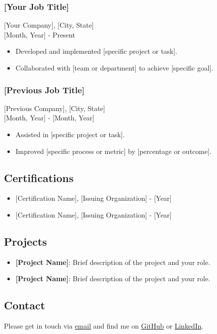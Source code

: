 \documentclass[11pt,a4paper]{article}
\providecommand{\tightlist}{%
  \setlength{\itemsep}{0pt}\setlength{\parskip}{0pt}}
\begin{document}
\subsubsection{{[}Your Job Title{]}}\label{your-job-title}

{[}Your Company{]}, {[}City, State{]}\\
{[}Month, Year{]} - Present

\begin{itemize}
\tightlist
\item
  Developed and implemented {[}specific project or task{]}.
\item
  Collaborated with {[}team or department{]} to achieve {[}specific
  goal{]}.
\end{itemize}

\subsubsection{{[}Previous Job Title{]}}\label{previous-job-title}

{[}Previous Company{]}, {[}City, State{]}\\
{[}Month, Year{]} - {[}Month, Year{]}

\begin{itemize}
\tightlist
\item
  Assisted in {[}specific project or task{]}.
\item
  Improved {[}specific process or metric{]} by {[}percentage or
  outcome{]}.
\end{itemize}

\subsection{Certifications}\label{certifications}

\begin{itemize}
\tightlist
\item
  {[}Certification Name{]}, {[}Issuing Organization{]} - {[}Year{]}
\item
  {[}Certification Name{]}, {[}Issuing Organization{]} - {[}Year{]}
\end{itemize}

\subsection{Projects}\label{projects}

\begin{itemize}
\tightlist
\item
  \textbf{{[}Project Name{]}}: Brief description of the project and your
  role.
\item
  \textbf{{[}Project Name{]}}: Brief description of the project and your
  role.
\end{itemize}

\subsection{Contact}\label{contact}

Please get in touch via \href{mailto:example@gmail.com}{email} and find
me on \href{https://github.com/}{GitHub} or
\href{https://www.linkedin.com/in/}{LinkedIn}.
\end{document}
